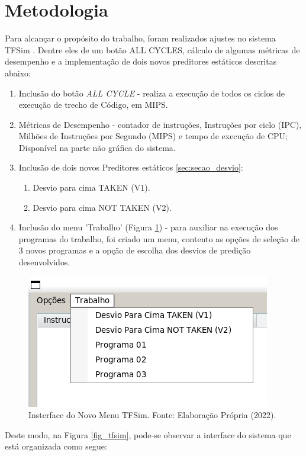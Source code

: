 \documentclass[12pt]{article}
\begin{document}
\section{Metodologia}

Para alcançar o propósito do trabalho, foram realizados ajustes no sistema TFSim \cite{lucas:2019}. Dentre eles de um botão ALL CYCLES, cálculo de algumas métricas de desempenho e a implementação de dois novos preditores estáticos descritas abaixo:

\begin{enumerate}
  \item Inclusão do botão \textit{ALL CYCLE} - realiza a execução de todos os ciclos de execução de trecho de Código, em MIPS.
  \item Métricas de Desempenho - contador de instruções, Instruções por ciclo (IPC), Milhões de Instruções por Segundo (MIPS) e tempo de execução de CPU; Disponível na parte não gráfica do sistema.
  \item Inclusão de dois novos Preditores estáticos \ref{sec:secao_desvio}:
        \begin{enumerate}
          \item Desvio para cima TAKEN (V1).
          \item Desvio para cima NOT TAKEN (V2).
        \end{enumerate}
  \item Inclusão do menu 'Trabalho' (Figura \ref{fig_menutfsim}) - para auxiliar na execução dos programas do trabalho, foi criado um menu, contento as opções de seleção de 3 novos programas e a opção de escolha dos desvios de predição desenvolvidos.
\end{enumerate}

\begin{figure}[h]
  \centering
  \includegraphics[width=.5\textwidth]{img/fig_menutfsim.png}
  \caption{Insterface do Novo Menu TFSim. Fonte: Elaboração Própria (2022).}
  \label{fig_menutfsim}
\end{figure}

Deste modo, na Figura \ref{fig_tfsim}, pode-se observar a interface do sistema que está organizada como segue:
\end{document}
